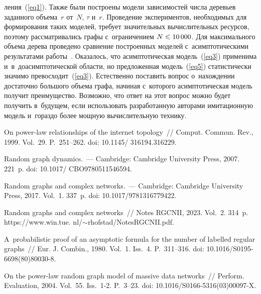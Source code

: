 \begin{multicols}{2}
\pagebreak

\noindent
ления~(\ref{eq1}). Также были построены модели зависимостей чис\-ла 
деревьев заданного объема~$r$ от~$N$, $\tau$ и~$r$. Проведение экспериментов, 
необходимых для формирования таких моделей, требует значительных вы\-чис\-ли\-тель\-ных 
ресурсов, поэтому рас\-смат\-ри\-ва\-лись графы с~ограничением $N\hm\leqslant 10\,000$. Для 
максимального объема дерева проведено сравнение по\-стро\-ен\-ных моделей 
с~асимп\-то\-ти\-че\-ски\-ми результатами работы~\cite{Pav}. Оказалось, что асимптотическая 
модель~(\ref{eq3}) применима и~в~до\-асимп\-то\-ти\-че\-ской об\-ласти, но предложенная 
модель~(\ref{eq5}) ста\-ти\-сти\-че\-ски значимо превосходит~(\ref{eq3}). Естественно 
поставить вопрос о~на\-хож\-де\-нии достаточно большого объема графа, начиная 
с~которого асимп\-то\-ти\-че\-ская модель получит преимущество. Возможно, что ответ на 
этот вопрос мож\-но будет получить в~будущем, если использовать разработанную 
авторами имитационную модель и~гораздо более мощную вы\-чис\-ли\-тель\-ную технику.


{\small\frenchspacing
 {\baselineskip=11.5pt
 \begin{thebibliography}{9}
 
 On power-law relationships of
the internet topology~// Comput. Commun. Rev., 1999. Vol.~29. P.~251--262.
doi: 10.1145/ 316194.316229.

 Random graph dynamics.~--- Cambridge: Cambridge University
Press, 2007. 221~p. doi: 10.1017/ CBO9780511546594.

 Random graphs and complex networks.~--- Cambridge:
Cambridge University Press, 2017. Vol.~1. 337~p. doi: 10.1017/9781316779422.

 Random graphs and complex networks~// Notes RGCNII, 2023. 
Vol.~2.
314~p. {\sf https://www.win.tue. nl/$\sim$rhofstad/NotesRGCNII.pdf.}



 A~probabilistic proof of an asymptotic formula for the 
number of labelled regular graphs~// Eur. J. Combin., 1980. Vol.~1.
Iss.~4. P.~311--316. doi: 10.1016/S0195-6698(80)80030-8.

 On the power-law random graph model of massive
data networks~// Perform. Evaluation, 2004. Vol.~55. Iss.~1-2. P.~3--23.
doi: 10.1016/S0166-5316(03)00097-X.


\end{thebibliography}}}
\end{multicols}
